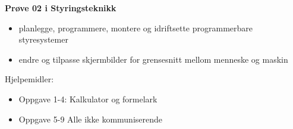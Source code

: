 
\begin{centering}
\Huge{\textbf{Prøve 02 i Styringsteknikk}}\\
\end{centering}
\vskip 2cm 
\begin{itemize}
	\item planlegge, programmere, montere og idriftsette programmerbare styresystemer
	\item endre og tilpasse skjermbilder for grensesnitt mellom menneske og maskin
\end{itemize}
\vskip 2.5pt 
Hjelpemidler:\begin{itemize}[noitemsep]
	\item Oppgave 1-4: Kalkulator og formelark
	\item Oppgave 5-9 Alle ikke kommuniserende
\end{itemize}

